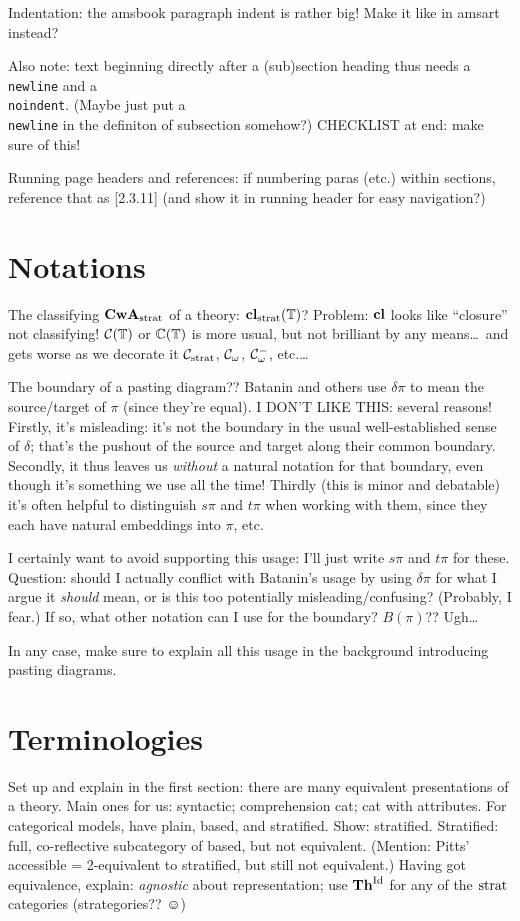 \documentclass{amsart}
\begin{document}
Indentation: the amsbook paragraph indent is rather big!  Make it like in amsart instead?

Also note: text beginning directly after a (sub)section heading thus needs a \texttt{\\newline} and a \texttt{\\noindent}.  (Maybe just put a \texttt{\\newline} in the definiton of subsection somehow?)  CHECKLIST at end: make sure of this!

Running page headers and references: if numbering paras (etc.) within sections,  reference that as [2.3.11] (and show it in running header for easy navigation?)

\section{Notations}
\para The classifying $\mathbf{CwA}_{\textrm{strat}}$ of a theory: $\mathbf{cl}_{\textrm{strat}}(\mathbb{T})$?  Problem: $\mathbf{cl}$ looks like ``closure'' not classifying!  $\mathcal{C}(\mathbb{T})$ or $\mathbb{C}(\mathbb{T})$ is more usual, but not brilliant by any means\ldots\ and gets worse as we decorate it $\mathcal{C}_{\textrm{strat}}$, $\mathcal{C}_\omega$, $\mathcal{C}^-_\omega$, etc.\ldots

\para The boundary of a pasting diagram??  Batanin and others use $\delta \pi$ to mean the source/target of $\pi$ (since they're equal).  I DON'T LIKE THIS: several reasons!  Firstly, it's misleading: it's not the boundary in the usual well-established sense of $\delta$; that's the pushout of the source and target along their common boundary.  Secondly, it thus leaves us \emph{without} a natural notation for that boundary, even though it's something we use all the time!  Thirdly (this is minor and debatable) it's often helpful to distinguish $s\pi$ and $t\pi$ when working with them, since they each have natural embeddings into $\pi$, etc.

I certainly want to avoid supporting this usage: I'll just write $s\pi$ and $t\pi$ for these.  Question: should I actually conflict with Batanin's usage by using $\delta \pi$ for what I argue it \emph{should} mean, or is this too potentially misleading/confusing?  (Probably, I fear.)  If so, what other notation can I use for the boundary?  $B(\pi)$??  Ugh\ldots

In any case, make sure to explain all this usage in the background introducing pasting diagrams.

\section{Terminologies}

Set up and explain in the first section: there are many equivalent presentations of a theory.  Main ones for us: syntactic; comprehension cat; cat with attributes.  For categorical models, have plain, based, and stratified.  Show: stratified.  Stratified: full, co-reflective subcategory of based, but not equivalent.  (Mention: Pitts' accessible = 2-equivalent to stratified, but still not equivalent.)  Having got equivalence, explain: \emph{agnostic} about representation; use $\mathbf{Th}^{\mathrm{Id}}$ for any of the $\textrm{strat}$ categories (strategories?? $\smiley$)
\end{document}
